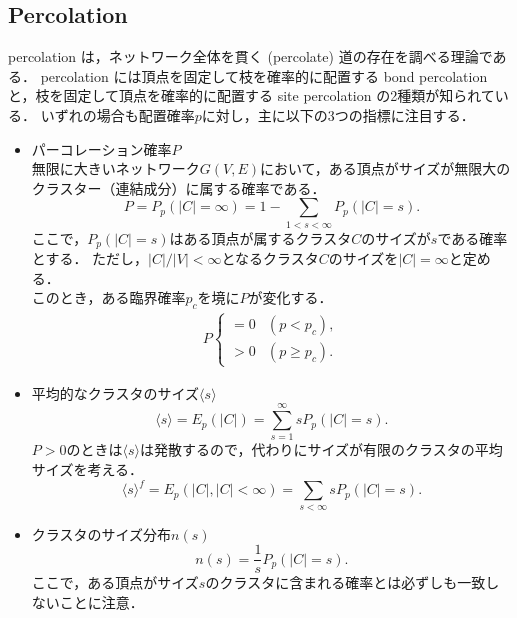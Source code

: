 \documentclass[../main]{subfiles}
\begin{document}
\subsection{Percolation}
percolation は，ネットワーク全体を貫く (percolate) 道の存在を調べる理論である．
percolation には頂点を固定して枝を確率的に配置する bond percolation と，枝を固定して頂点を確率的に配置する site percolation の2種類が知られている．
いずれの場合も配置確率$p$に対し，主に以下の3つの指標に注目する．
\begin{itemize}
    \item パーコレーション確率$P$\\
        無限に大きいネットワーク$G(V,E)$において，ある頂点がサイズが無限大のクラスター（連結成分）に属する確率である．
        \begin{equation}
            P=P_p(|C|=\infty)=1-\sum_{1<s<\infty}P_p(|C|=s).
        \end{equation} 
        ここで，$P_p(|C|=s)$はある頂点が属するクラスタ$C$のサイズが$s$である確率とする．
        ただし，$|C|/|V|<\infty$となるクラスタ$C$のサイズを$|C|=\infty$と定める．\\
        このとき，ある臨界確率$p_c$を境に$P$が変化する．
        \begin{align}
            P
            \begin{cases}
                = 0 & (p<p_c),\\
                > 0 & (p\geq p_c).
            \end{cases}
        \end{align}
    \item 平均的なクラスタのサイズ$\langle s \rangle$
        \begin{equation}
            \langle s\rangle =E_p(|C|)=\sum_{s=1}^\infty sP_p(|C|=s).
        \end{equation}
        $P>0$のときは$\langle s\rangle$は発散するので，代わりにサイズが有限のクラスタの平均サイズを考える．
        \begin{equation}
            \langle s\rangle^f =E_p(|C|,|C|<\infty)=\sum_{s<\infty} sP_p(|C|=s).            
        \end{equation}
    \item クラスタのサイズ分布$n(s)$
    \begin{equation}
        n(s)=\frac{1}{s}P_p(|C|=s).
    \end{equation}
    ここで，ある頂点がサイズ$s$のクラスタに含まれる確率とは必ずしも一致しないことに注意．
\end{itemize}
\end{document}
